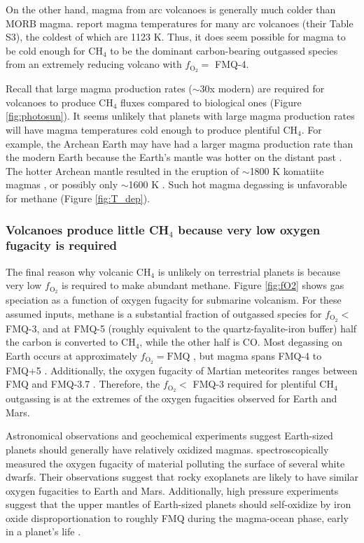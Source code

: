 On the other hand, magma from arc volcanoes is generally much colder than MORB magma. \citet{Moussallam_2019} report magma temperatures for many arc volcanoes (their Table S3), the coldest of which are 1123 K. Thus, it does seem possible for magma to be cold enough for CH$_4$ to be the dominant carbon-bearing outgassed species from an extremely reducing volcano with $f_\mathrm{O_2}=$ FMQ-4.

Recall that large magma production rates ($\sim$30x modern) are required for volcanoes to produce CH$_4$ fluxes compared to biological ones (Figure \ref{fig:photosun}). It seems unlikely that planets with large magma production rates will have magma temperatures cold enough to produce plentiful CH$_4$. For example, the Archean Earth may have had a larger magma production rate than the modern Earth because the Earth's mantle was hotter on the distant past \citep{Sleep_2001}. The hotter Archean mantle resulted in the eruption of $\sim$1800 K komatiite magmas \citep{Huppert_1984}, or possibly only $\sim$1600 K \citep{McKenzie_2020}. Such hot magma degassing is unfavorable for methane (Figure \ref{fig:T_dep}).

\subsubsection{Volcanoes produce little CH$_4$ because very low oxygen fugacity is required}

The final reason why volcanic CH$_4$ is unlikely on terrestrial planets is because very low $f_\mathrm{O_2}$ is required to make abundant methane. Figure \ref{fig:fO2} shows gas speciation as a function of oxygen fugacity for submarine volcanism. For these assumed inputs, methane is a substantial fraction of outgassed species for $f_\mathrm{O_2}<$ FMQ-3, and at FMQ-5 (roughly equivalent to the quartz-fayalite-iron buffer) half the carbon is converted to CH$_4$, while the other half is CO. Most degassing on Earth occurs at approximately $f_\mathrm{O_2}=\mathrm{FMQ}$ \citep[p. 208]{Catling_2017}, but magma spans FMQ-4 to FMQ+5 \citep{Stamper_2014}. Additionally, the oxygen fugacity of Martian meteorites ranges between FMQ and FMQ-3.7 \citep[p. 363]{Catling_2017}. Therefore, the $f_\mathrm{O_2}<$ FMQ-3 required for plentiful CH$_4$ outgassing is at the extremes of the oxygen fugacities observed for Earth and Mars. 

Astronomical observations and geochemical experiments suggest Earth-sized planets should generally have relatively oxidized magmas. \citet{Doyle_2019} spectroscopically measured the oxygen fugacity of material polluting the surface of several white dwarfs. Their observations suggest that rocky exoplanets are likely to have similar oxygen fugacities to Earth and Mars. Additionally, high pressure experiments suggest that the upper mantles of Earth-sized planets should self-oxidize by iron oxide disproportionation to roughly FMQ during the magma-ocean phase, early in a planet's life \citep{Armstrong_2019}.

